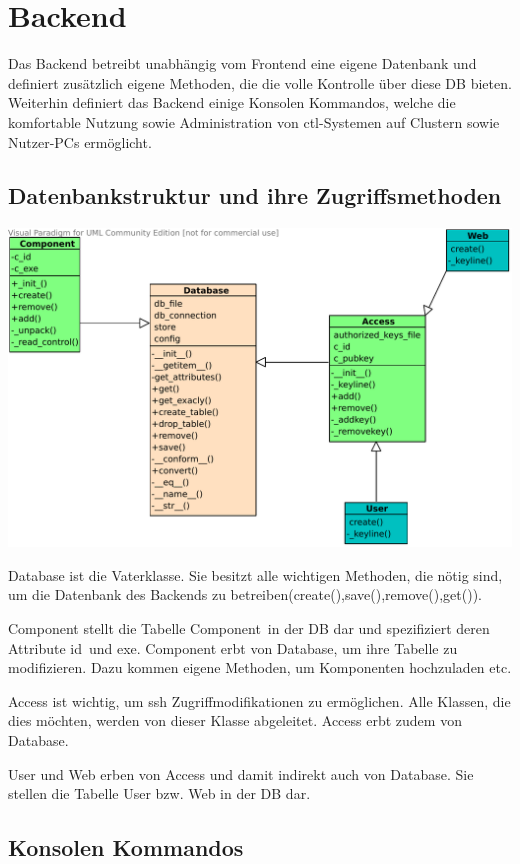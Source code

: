 \section{Backend}
Das Backend betreibt unabhängig vom Frontend eine eigene Datenbank und definiert
zusätzlich eigene Methoden, die die volle Kontrolle über diese DB bieten.
Weiterhin definiert das Backend einige Konsolen Kommandos, welche die 
komfortable Nutzung sowie Administration von ctl-Systemen auf Clustern 
sowie Nutzer-PCs ermöglicht.   

\subsection{Datenbankstruktur und ihre Zugriffsmethoden}
  \includegraphics{bilder/clsdiagrambackend.pdf}

Database ist die Vaterklasse. Sie besitzt alle wichtigen Methoden,
die nötig sind, um die Datenbank des Backends zu
betreiben(create(),save(),remove(),get()).

Component stellt die Tabelle \glqq Component\grqq\ in der DB dar und 
spezifiziert deren Attribute \glqq id\grqq\ und \grqq exe\grqq. Component 
erbt von Database, um ihre Tabelle zu modifizieren. Dazu kommen eigene 
Methoden, um Komponenten hochzuladen etc.

Access ist wichtig, um ssh Zugriffmodifikationen zu ermöglichen.
Alle Klassen, die dies möchten, werden von dieser Klasse abgeleitet.
Access erbt zudem von Database.

User und Web erben von Access und damit indirekt auch von Database.
Sie stellen die Tabelle User bzw. Web in der DB dar.

\subsection{Konsolen Kommandos}

